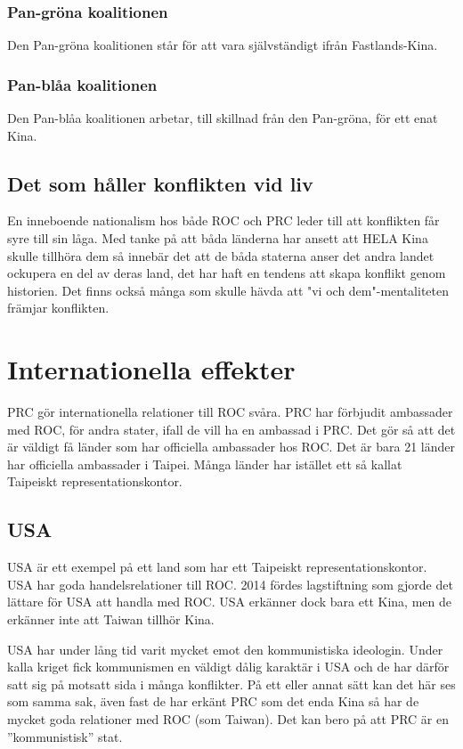 \documentclass[a4paper,10pt]{article}
\begin{document}
\subsubsection*{Pan-gröna koalitionen}
Den Pan-gröna koalitionen står för att vara självständigt ifrån Fastlands-Kina.

\subsubsection*{Pan-blåa koalitionen}
Den Pan-blåa koalitionen arbetar, till skillnad från den Pan-gröna, för ett enat Kina.

\subsection*{Det som håller konflikten vid liv}
En inneboende nationalism hos både ROC och PRC leder till att konflikten får syre till sin låga. Med tanke på att båda länderna har ansett att HELA Kina skulle tillhöra dem så innebär det att de båda staterna anser det andra landet ockupera en del av deras land, det har haft en tendens att skapa konflikt genom historien. Det finns också många som skulle hävda att "vi och dem"-mentaliteten främjar konflikten.

\section*{Internationella effekter}
PRC gör internationella relationer till ROC svåra. PRC har förbjudit ambassader med ROC, för andra stater, ifall de vill ha en ambassad i PRC. Det gör så att det är väldigt få länder som har officiella ambassader hos ROC. Det är bara 21 länder har officiella ambassader i Taipei. Många länder har istället ett så kallat Taipeiskt representationskontor.

\subsection*{USA}
USA är ett exempel på ett land som har ett Taipeiskt representationskontor. USA har goda handelsrelationer till ROC. 2014 fördes lagstiftning som gjorde det lättare för USA att handla med ROC. USA erkänner dock bara ett Kina, men de erkänner inte att Taiwan tillhör Kina. 

USA har under lång tid varit mycket emot den kommunistiska ideologin. Under kalla kriget fick kommunismen en väldigt dålig karaktär i USA och de har därför satt sig på motsatt sida i många konflikter. På ett eller annat sätt kan det här ses som samma sak, även fast de har erkänt PRC som det enda Kina så har de mycket goda relationer med ROC (som Taiwan). Det kan bero på att PRC är en ''kommunistisk'' stat.
\end{document}
